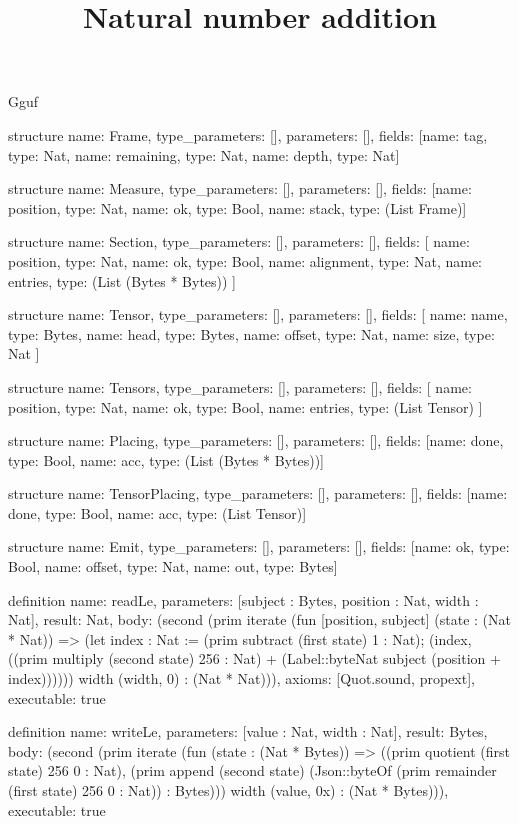 \begin{lexlean}{Gguf}
\title{Natural number addition}
\begin{semanticmodule}
structure{
  name: Frame,
  type_parameters: [],
  parameters: [],
  fields: [{name: tag, type: Nat}, {name: remaining, type: Nat}, {name: depth, type: Nat}]
}

structure{
  name: Measure,
  type_parameters: [],
  parameters: [],
  fields: [{name: position, type: Nat}, {name: ok, type: Bool}, {name: stack, type: (List Frame)}]
}

structure{
  name: Section,
  type_parameters: [],
  parameters: [],
  fields: [
    {name: position, type: Nat},
    {name: ok, type: Bool},
    {name: alignment, type: Nat},
    {name: entries, type: (List (Bytes * Bytes))}
  ]
}

structure{
  name: Tensor,
  type_parameters: [],
  parameters: [],
  fields: [
    {name: name, type: Bytes},
    {name: head, type: Bytes},
    {name: offset, type: Nat},
    {name: size, type: Nat}
  ]
}

structure{
  name: Tensors,
  type_parameters: [],
  parameters: [],
  fields: [
    {name: position, type: Nat},
    {name: ok, type: Bool},
    {name: entries, type: (List Tensor)}
  ]
}

structure{
  name: Placing,
  type_parameters: [],
  parameters: [],
  fields: [{name: done, type: Bool}, {name: acc, type: (List (Bytes * Bytes))}]
}

structure{
  name: TensorPlacing,
  type_parameters: [],
  parameters: [],
  fields: [{name: done, type: Bool}, {name: acc, type: (List Tensor)}]
}

structure{
  name: Emit,
  type_parameters: [],
  parameters: [],
  fields: [{name: ok, type: Bool}, {name: offset, type: Nat}, {name: out, type: Bytes}]
}

definition{
  name: readLe,
  parameters: [subject : Bytes, position : Nat, width : Nat],
  result: Nat,
  body: (second (prim iterate (fun [position, subject] (state : (Nat * Nat)) => (let index : Nat := (prim subtract (first state) 1 : Nat); (index, ((prim multiply (second state) 256 : Nat) + (Label::byteNat subject (position + index)))))) width (width, 0) : (Nat * Nat))),
  axioms: [Quot.sound, propext],
  executable: true
}

definition{
  name: writeLe,
  parameters: [value : Nat, width : Nat],
  result: Bytes,
  body: (second (prim iterate (fun (state : (Nat * Bytes)) => ((prim quotient (first state) 256 0 : Nat), (prim append (second state) (Json::byteOf (prim remainder (first state) 256 0 : Nat)) : Bytes))) width (value, 0x) : (Nat * Bytes))),
  executable: true
}


\end{semanticmodule}
\end{lexlean}
